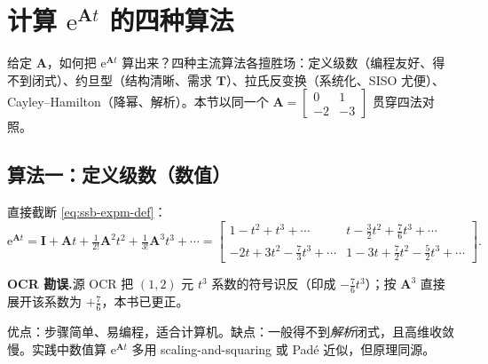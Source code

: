 \section{计算 \texorpdfstring{$\mathrm{e}^{\mathbf{A}t}$}{e\^{}\{At\}} 的四种算法}
\label{sec:ssb-four-algos}

给定 $\mathbf{A}$，如何把 $\mathrm{e}^{\mathbf{A}t}$ 算出来？四种主流算法各擅胜场：定义级数（编程友好、得不到闭式）、约旦型（结构清晰、需求 $\mathbf{T}$）、拉氏反变换（系统化、SISO 尤便）、Cayley--Hamilton（降幂、解析）。本节以同一个 $\mathbf{A}=\begin{bmatrix}0&1\\-2&-3\end{bmatrix}$ 贯穿四法对照。

\subsection{算法一：定义级数（数值）}
直接截断 \cref{eq:ssb-expm-def}：
\[
  \mathrm{e}^{\mathbf{A}t}=\mathbf{I}+\mathbf{A}t+\tfrac{1}{2!}\mathbf{A}^2t^2+\tfrac{1}{3!}\mathbf{A}^3t^3+\cdots
  =\begin{bmatrix}1-t^2+t^3+\cdots & t-\tfrac{3}{2}t^2+\tfrac{7}{6}t^3+\cdots\\[2pt] -2t+3t^2-\tfrac{7}{3}t^3+\cdots & 1-3t+\tfrac{7}{2}t^2-\tfrac{5}{2}t^3+\cdots\end{bmatrix}.
\]
\begin{note}\textbf{OCR 勘误.}\;源 OCR 把 $(1,2)$ 元 $t^3$ 系数的符号识反（印成 $-\tfrac76 t^3$）；按 $\mathbf{A}^3$ 直接展开该系数为 $+\tfrac76$，本书已更正\cite{liubao2006modern}。\end{note}
优点：步骤简单、易编程，适合计算机。缺点：一般得不到\emph{解析}闭式，且高维收敛慢。实践中数值算 $\mathrm{e}^{\mathbf{A}t}$ 多用 scaling-and-squaring 或 Padé 近似，但原理同源。

